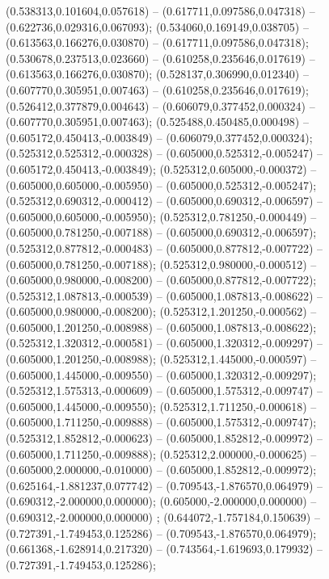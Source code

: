  (0.538313,0.101604,0.057618) -- (0.617711,0.097586,0.047318) -- (0.622736,0.029316,0.067093);
 (0.534060,0.169149,0.038705) -- (0.613563,0.166276,0.030870) -- (0.617711,0.097586,0.047318);
 (0.530678,0.237513,0.023660) -- (0.610258,0.235646,0.017619) -- (0.613563,0.166276,0.030870);
 (0.528137,0.306990,0.012340) -- (0.607770,0.305951,0.007463) -- (0.610258,0.235646,0.017619);
 (0.526412,0.377879,0.004643) -- (0.606079,0.377452,0.000324) -- (0.607770,0.305951,0.007463);
 (0.525488,0.450485,0.000498) -- (0.605172,0.450413,-0.003849) -- (0.606079,0.377452,0.000324);
 (0.525312,0.525312,-0.000328) -- (0.605000,0.525312,-0.005247) -- (0.605172,0.450413,-0.003849);
 (0.525312,0.605000,-0.000372) -- (0.605000,0.605000,-0.005950) -- (0.605000,0.525312,-0.005247);
 (0.525312,0.690312,-0.000412) -- (0.605000,0.690312,-0.006597) -- (0.605000,0.605000,-0.005950);
 (0.525312,0.781250,-0.000449) -- (0.605000,0.781250,-0.007188) -- (0.605000,0.690312,-0.006597);
 (0.525312,0.877812,-0.000483) -- (0.605000,0.877812,-0.007722) -- (0.605000,0.781250,-0.007188);
 (0.525312,0.980000,-0.000512) -- (0.605000,0.980000,-0.008200) -- (0.605000,0.877812,-0.007722);
 (0.525312,1.087813,-0.000539) -- (0.605000,1.087813,-0.008622) -- (0.605000,0.980000,-0.008200);
 (0.525312,1.201250,-0.000562) -- (0.605000,1.201250,-0.008988) -- (0.605000,1.087813,-0.008622);
 (0.525312,1.320312,-0.000581) -- (0.605000,1.320312,-0.009297) -- (0.605000,1.201250,-0.008988);
 (0.525312,1.445000,-0.000597) -- (0.605000,1.445000,-0.009550) -- (0.605000,1.320312,-0.009297);
 (0.525312,1.575313,-0.000609) -- (0.605000,1.575312,-0.009747) -- (0.605000,1.445000,-0.009550);
 (0.525312,1.711250,-0.000618) -- (0.605000,1.711250,-0.009888) -- (0.605000,1.575312,-0.009747);
 (0.525312,1.852812,-0.000623) -- (0.605000,1.852812,-0.009972) -- (0.605000,1.711250,-0.009888);
 (0.525312,2.000000,-0.000625) -- (0.605000,2.000000,-0.010000) -- (0.605000,1.852812,-0.009972);
 (0.625164,-1.881237,0.077742) -- (0.709543,-1.876570,0.064979) -- (0.690312,-2.000000,0.000000);
 (0.605000,-2.000000,0.000000) -- (0.690312,-2.000000,0.000000) ;
 (0.644072,-1.757184,0.150639) -- (0.727391,-1.749453,0.125286) -- (0.709543,-1.876570,0.064979);
 (0.661368,-1.628914,0.217320) -- (0.743564,-1.619693,0.179932) -- (0.727391,-1.749453,0.125286);
